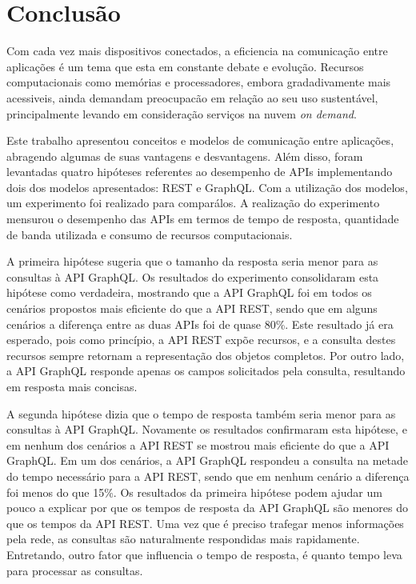 \chapter{Conclusão}

Com cada vez mais dispositivos conectados, a eficiencia na comunicação entre aplicações é um tema que esta em constante debate e evolução. Recursos computacionais como memórias e processadores, embora gradadivamente mais acessiveis, ainda demandam preocupacão em relação ao seu uso sustentável, principalmente levando em consideração serviços na nuvem \textit{on demand}.

Este trabalho apresentou conceitos e modelos de comunicação entre aplicações, abragendo algumas de suas vantagens e desvantagens. Além disso, foram levantadas quatro hipóteses referentes ao desempenho de APIs implementando dois dos modelos apresentados: REST e GraphQL. Com a utilização dos modelos, um experimento foi realizado para comparálos. A realização do experimento mensurou o 
desempenho das APIs em termos de tempo de resposta, quantidade de banda utilizada e consumo de recursos computacionais.

A primeira hipótese sugeria que o tamanho da resposta seria menor para as consultas à API GraphQL. Os resultados do experimento consolidaram esta hipótese como verdadeira, mostrando que a API GraphQL foi em todos os cenários propostos mais eficiente do que a API REST, sendo que em alguns cenários a diferença entre as duas APIs foi de quase 80\%. Este resultado já era esperado, pois como princípio, a API REST expõe recursos, e a consulta destes recursos sempre retornam a representação dos objetos completos. Por outro lado, a API GraphQL responde apenas os campos solicitados pela consulta, resultando em resposta mais concisas.

A segunda hipótese dizia que o tempo de resposta também seria menor para as consultas à API GraphQL. Novamente os resultados confirmaram esta hipótese, e em nenhum dos cenários a API REST se mostrou mais eficiente do que a API GraphQL. Em um dos cenários, a API GraphQL respondeu a consulta na metade do tempo necessário para a API REST, sendo que em nenhum cenário a diferença foi menos do que 15\%. Os resultados da primeira hipótese podem ajudar um pouco a explicar por que os tempos de resposta da API GraphQL são menores do que os tempos da API REST. Uma vez que é preciso trafegar menos informações pela rede, as consultas são naturalmente respondidas mais rapidamente. Entretando, outro fator que influencia o tempo de resposta, é quanto tempo leva para processar as consultas.

